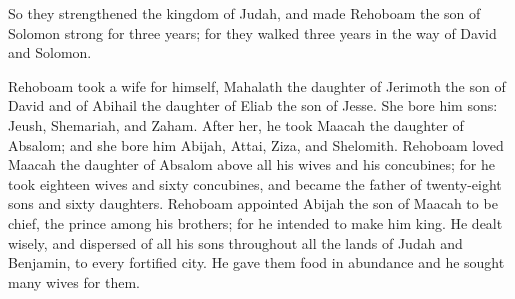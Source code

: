 {So they strengthened the kingdom of Judah, and made Rehoboam the son of Solomon strong for three years; for they walked three years in the way of David and Solomon.
\par }{\PP {}Rehoboam took a wife for himself, Mahalath the daughter of Jerimoth the son of David and of Abihail the daughter of Eliab the son of Jesse.
She bore him sons: Jeush, Shemariah, and Zaham.
After her, he took Maacah the daughter of Absalom; and she bore him Abijah, Attai, Ziza, and Shelomith.
Rehoboam loved Maacah the daughter of Absalom above all his wives and his concubines; for he took eighteen wives and sixty concubines, and became the father of twenty-eight sons and sixty daughters.
Rehoboam appointed Abijah the son of Maacah to be chief, the prince among his brothers; for he intended to make him king.
He dealt wisely, and dispersed of all his sons throughout all the lands of Judah and Benjamin, to every fortified city. He gave them food in abundance and he sought many wives for them.

}
